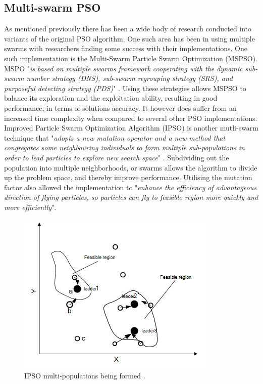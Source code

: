 \documentclass[oneside,12pt]{book}
\begin{document}
\subsection{Multi-swarm PSO}
As mentioned previously there has been a wide body of research conducted into variants of the original PSO algorithm. One such area has been in using multiple swarms with researchers finding some success with their implementations. One such implementation is the Multi-Swarm Particle Swarm Optimization (MSPSO). MSPO "\textit{is based on multiple swarms framework cooperating with the dynamic sub-swarm number strategy (DNS), sub-swarm regrouping strategy (SRS), and purposeful detecting strategy (PDS)}" \cite{XIA2018126}. Using these strategies allows MSPSO to balance its exploration and the exploitation ability, resulting in good performance, in terms of solutions accuracy. It however does suffer from an increased time complexity when compared to several other PSO implementations. 
Improved Particle Swarm Optimization Algorithm (IPSO) is another mutli-swarm technique that "\textit{adopts a new mutation operator and a new method that congregates some neighbouring individuals to form multiple sub-populations in order to lead particles to explore new search space}" \cite{zheng2007improved}. Subdividing out the population into multiple neighborhoods, or swarms allows the algorithm to divide up the problem space, and thereby improve performance. Utilising the mutation factor also allowed the implementation to "\textit{enhance the efficiency of advantageous direction of flying particles, so particles can fly to feasible region more quickly and more efficiently}".
\begin{figure}[H]
    \centering
    \includegraphics[scale=1.0]{Images/IpsoFormingSwarms.png}
    \caption{IPSO multi-populations being formed .\protect\cite{zheng2007improved} }
    \label{fig:IPSO multi-populations being formed.}
\end{figure}
\end{document}
